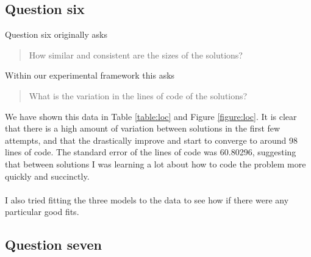 \subsection{Question six}

Question six originally asks
\begin{quote}
  How similar and consistent are the sizes of the solutions?
\end{quote}

Within our experimental framework this asks
\begin{quote}
  What is the variation in the lines of code of the solutions?
\end{quote}

We have shown this data in Table \ref{table:loc} and Figure \ref{figure:loc}.
It is clear that there is a high amount of variation between solutions in the
first few attempts, and that the drastically improve and start to converge to
around 98 lines of code.
The standard error of the lines of code was 60.80296, suggesting that between
solutions I was learning a lot about how to code the problem more quickly and
succinctly.\\
\\
I also tried fitting the three models to the data to see how if there were any
particular good fits.

\subsection{Question seven}
